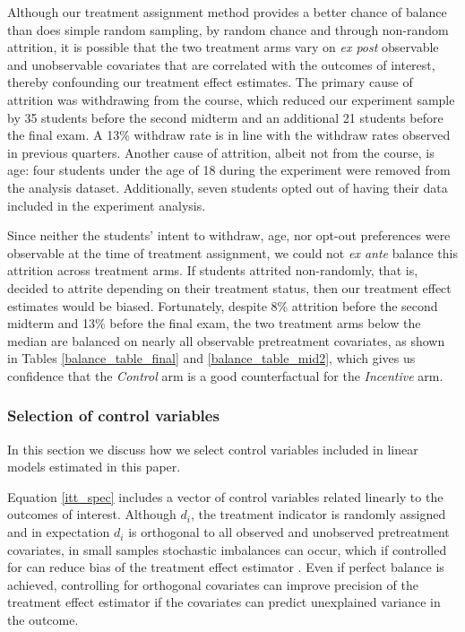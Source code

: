 \documentclass[12pt]{article}
\begin{document}
Although our treatment assignment method provides a better chance of balance than does simple random sampling, by random chance and through non-random attrition, it is possible that the two treatment arms vary on \textit{ex post} observable and unobservable covariates that are correlated with the outcomes of interest, thereby confounding our treatment effect estimates. The primary cause of attrition was withdrawing from the course, which reduced our experiment sample by 35 students before the second midterm and an additional 21 students before the final exam. A 13\% withdraw rate is in line with the withdraw rates observed in previous quarters. Another cause of attrition, albeit not from the course, is age: four students under the age of 18 during the experiment were removed from the analysis dataset. Additionally, seven students opted out of having their data included in the experiment analysis.

Since neither the students' intent to withdraw, age, nor opt-out preferences were observable at the time of treatment assignment, we could not \textit{ex ante} balance this attrition across treatment arms. If students attrited non-randomly, that is, decided to attrite depending on their treatment status, then our treatment effect estimates would be biased. Fortunately, despite 8\% attrition before the second midterm and 13\% before the final exam, the two treatment arms below the median are balanced on nearly all observable pretreatment covariates, as shown in Tables \ref{balance_table_final} and \ref{balance_table_mid2}, which gives us confidence that the \textit{Control} arm is a good counterfactual for the \textit{Incentive} arm.

\subsubsection{Selection of control variables} \label{a_selection}

In this section we discuss how we select control variables included in linear models estimated in this paper.

Equation \ref{itt_spec} includes a vector of control variables related linearly to the outcomes of interest. Although $d_i$, the treatment indicator is randomly assigned and in expectation $d_i$ is orthogonal to all observed and unobserved pretreatment covariates, in small samples stochastic imbalances can occur, which if controlled for can reduce bias of the treatment effect estimator \parencite{ai2017}. Even if perfect balance is achieved, controlling for orthogonal covariates can improve precision of the treatment effect estimator if the covariates can predict unexplained variance in the outcome.
\end{document}
